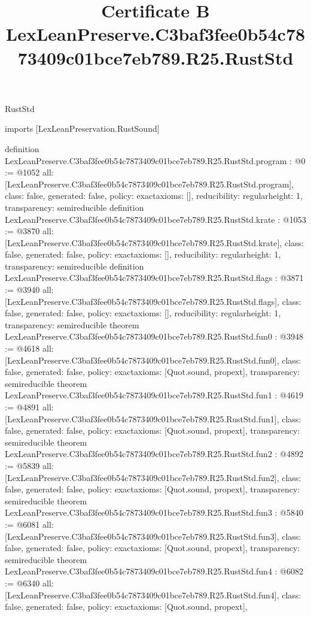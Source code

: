 \begin{lexlean}{RustStd}
\title{Certificate B LexLeanPreserve.C3baf3fee0b54c7873409c01bce7eb789.R25.RustStd}
\begin{coremodule}
imports [LexLeanPreservation.RustSound]

definition LexLeanPreserve.C3baf3fee0b54c7873409c01bce7eb789.R25.RustStd.program : @0 := @1052 {
  all: [LexLeanPreserve.C3baf3fee0b54c7873409c01bce7eb789.R25.RustStd.program],
  class: false,
  generated: false,
  policy: exact{axioms: []},
  reducibility: regular{height: 1},
  transparency: semireducible
}
definition LexLeanPreserve.C3baf3fee0b54c7873409c01bce7eb789.R25.RustStd.krate : @1053 := @3870 {
  all: [LexLeanPreserve.C3baf3fee0b54c7873409c01bce7eb789.R25.RustStd.krate],
  class: false,
  generated: false,
  policy: exact{axioms: []},
  reducibility: regular{height: 1},
  transparency: semireducible
}
definition LexLeanPreserve.C3baf3fee0b54c7873409c01bce7eb789.R25.RustStd.flags : @3871 := @3940 {
  all: [LexLeanPreserve.C3baf3fee0b54c7873409c01bce7eb789.R25.RustStd.flags],
  class: false,
  generated: false,
  policy: exact{axioms: []},
  reducibility: regular{height: 1},
  transparency: semireducible
}
theorem LexLeanPreserve.C3baf3fee0b54c7873409c01bce7eb789.R25.RustStd.fun0 : @3948 := @4618 {
  all: [LexLeanPreserve.C3baf3fee0b54c7873409c01bce7eb789.R25.RustStd.fun0],
  class: false,
  generated: false,
  policy: exact{axioms: [Quot.sound, propext]},
  transparency: semireducible
}
theorem LexLeanPreserve.C3baf3fee0b54c7873409c01bce7eb789.R25.RustStd.fun1 : @4619 := @4891 {
  all: [LexLeanPreserve.C3baf3fee0b54c7873409c01bce7eb789.R25.RustStd.fun1],
  class: false,
  generated: false,
  policy: exact{axioms: [Quot.sound, propext]},
  transparency: semireducible
}
theorem LexLeanPreserve.C3baf3fee0b54c7873409c01bce7eb789.R25.RustStd.fun2 : @4892 := @5839 {
  all: [LexLeanPreserve.C3baf3fee0b54c7873409c01bce7eb789.R25.RustStd.fun2],
  class: false,
  generated: false,
  policy: exact{axioms: [Quot.sound, propext]},
  transparency: semireducible
}
theorem LexLeanPreserve.C3baf3fee0b54c7873409c01bce7eb789.R25.RustStd.fun3 : @5840 := @6081 {
  all: [LexLeanPreserve.C3baf3fee0b54c7873409c01bce7eb789.R25.RustStd.fun3],
  class: false,
  generated: false,
  policy: exact{axioms: [Quot.sound, propext]},
  transparency: semireducible
}
theorem LexLeanPreserve.C3baf3fee0b54c7873409c01bce7eb789.R25.RustStd.fun4 : @6082 := @6340 {
  all: [LexLeanPreserve.C3baf3fee0b54c7873409c01bce7eb789.R25.RustStd.fun4],
  class: false,
  generated: false,
  policy: exact{axioms: [Quot.sound, propext]},
}
\end{coremodule}
\end{lexlean}
